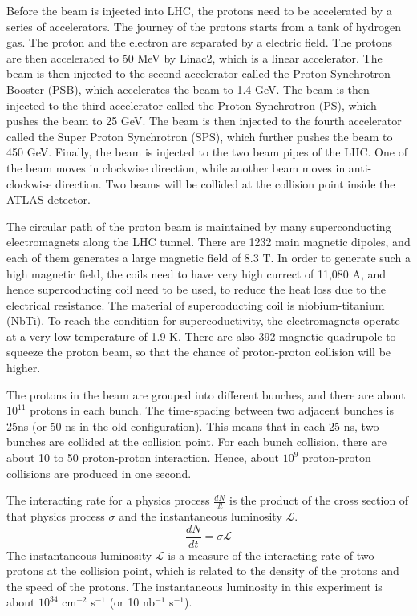 Before the beam is injected into LHC, the protons need to be accelerated by a series of accelerators.
The journey of the protons starts from a tank of hydrogen gas.
The proton and the electron are separated by a electric field.
The protons are then accelerated to 50 MeV by Linac2, which is a linear accelerator.
The beam is then injected to the second accelerator called the Proton Synchrotron Booster (PSB), which accelerates the beam to 1.4 GeV.
The beam is then injected to the third accelerator called the Proton Synchrotron (PS), which pushes the beam to 25 GeV.
The beam is then injected to the fourth accelerator called the Super Proton Synchrotron (SPS), which further pushes the beam to 450 GeV.
Finally, the beam is injected to the two beam pipes of the LHC.
One of the beam moves in clockwise direction, while another beam moves in anti-clockwise direction.
Two beams will be collided at the collision point inside the ATLAS detector.
\cite{accelerator}

The circular path of the proton beam is maintained by many superconducting electromagnets along the LHC tunnel.
There are 1232 main magnetic dipoles, and each of them generates a large magnetic field of 8.3 T.
In order to generate such a high magnetic field, the coils need to have very high currect of 11,080 A, and hence supercoducting coil need to be used, to reduce the heat loss due to the electrical resistance.
The material of supercoducting coil is niobium-titanium (NbTi).
To reach the condition for supercoductivity, the electromagnets operate at a very low temperature of 1.9 K.
There are also 392 magnetic quadrupole to squeeze the proton beam, so that the chance of proton-proton collision will be higher.
\cite{supermagnet,cryogenics}

The protons in the beam are grouped into different bunches, and there are about $10^{11}$ protons in each bunch.
The time-spacing between two adjacent bunches is 25ns (or 50 ns in the old configuration).
This means that in each 25 ns, two bunches are collided at the collision point.
For each bunch collision, there are about 10 to 50 proton-proton interaction.
Hence, about $10^9$ proton-proton collisions are produced in one second.

The interacting rate for a physics process $\frac{dN}{dt}$ is the product of the cross section of that physics process $\sigma$ and the instantaneous luminosity $\mathcal{L}$.
\begin{equation}
\frac{dN}{dt} = \sigma \mathcal{L}
\end{equation}
The instantaneous luminosity $\mathcal{L}$ is a measure of the interacting rate of two protons at the collision point, which is related to the density of the protons and the speed of the protons.
The instantaneous luminosity in this experiment is about $10^{34}$ cm$^{-2}$ s$^{-1}$ (or 10 nb$^{-1}$ s$^{-1}$).

